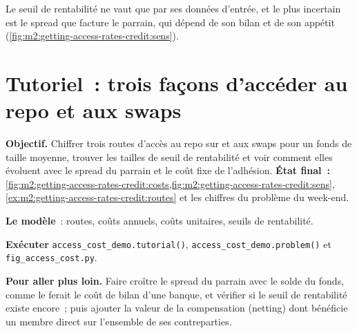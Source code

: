Le seuil de rentabilité ne vaut que par ses données d'entrée, et le plus incertain est le
spread que facture le parrain, qui dépend de son bilan et de son appétit
(\cref{fig:m2:getting-access-rates-credit:sens}).

\begin{omfigure}

\label{fig:m2:getting-access-rates-credit:sens}
\end{omfigure}

\section{Tutoriel~: trois façons d'accéder au repo et aux swaps}\label{tut:m2:getting-access-rates-credit:cost}

\begin{tutorial}
\textbf{Objectif.} Chiffrer trois routes d'accès au repo sur  et aux swaps pour un fonds de taille moyenne, trouver les
tailles de seuil de rentabilité et voir comment elles évoluent avec le spread du parrain et le coût fixe de
l'adhésion.
\textbf{État final~:} \cref{fig:m2:getting-access-rates-credit:costs,fig:m2:getting-access-rates-credit:sens},
\cref{ex:m2:getting-access-rates-credit:routes} et les chiffres du problème du week-end.
\begin{tutsteps}
\item \textbf{Le modèle}~: routes, coûts annuels, coûts unitaires, seuils de rentabilité.
\label{lst:m2:getting-access-rates-credit:model}
\item \textbf{Exécuter} \texttt{access\_cost\_demo.tutorial()},
\texttt{access\_cost\_demo.problem()} et \texttt{fig\_access\_cost.py}.
\end{tutsteps}
\textbf{Pour aller plus loin.} Faire croître le spread du parrain avec le solde du fonds, comme le ferait
le coût de bilan d'une banque, et vérifier si le seuil de rentabilité existe encore~; puis ajouter
la valeur de la compensation (netting) dont bénéficie un membre direct sur l'ensemble de ses contreparties.
\end{tutorial}

